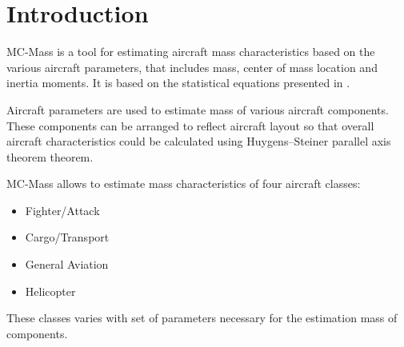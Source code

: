 \chapter{Introduction}

MC-Mass is a tool for estimating aircraft mass characteristics based on the various aircraft parameters, that includes mass, center of mass location and inertia moments. It is based on the statistical equations presented in \cite{Raymer1992,NASA-TP-2015-218751}.

Aircraft parameters are used to estimate mass of various aircraft components. These components can be arranged to reflect aircraft layout so that overall aircraft characteristics could be calculated using Huygens–Steiner parallel axis theorem theorem.

MC-Mass allows to estimate mass characteristics of four aircraft classes:
\begin{itemize}[noitemsep,label={--}]
  \item Fighter/Attack
  \item Cargo/Transport
  \item General Aviation
  \item Helicopter
\end{itemize}

These classes varies with set of parameters necessary for the estimation mass of components.
